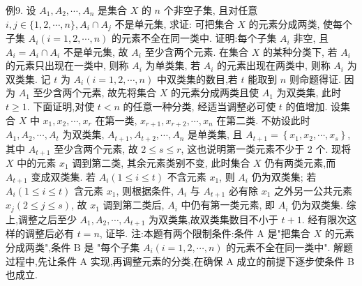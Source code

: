 例9. 设 $A_1, A_2, \cdots, A_n$ 是集合 $X$ 的 $n$ 个非空子集, 且对任意 $i, j \in \{1,2, \cdots, n\}, A_i \cap A_j$ 不是单元集, 求证: 可把集合 $X$ 的元素分成两类, 使每个子集 $A_i(i=1,2, \cdots, n)$ 的元素不全在同一类中.
证明:每个子集 $A_i$ 非空, 且 $A_i=A_i \cap A_i$ 不是单元集, 故 $A_i$ 至少含两个元素.
在集合 $X$ 的某种分类下, 若 $A_i$ 的元素只出现在一类中, 则称 $A_i$ 为单类集, 若 $A_i$ 的元素出现在两类中, 则称 $A_i$ 为双类集.
记 $t$ 为 $A_i(i=1,2, \cdots, n)$ 中双类集的数目,若 $t$ 能取到 $n$ 则命题得证.
因为 $A_1$ 至少含两个元素, 故先将集合 $X$ 的元素分成两类且使 $A_1$ 为双类集, 此时 $t \geqslant 1$.
下面证明,对使 $t<n$ 的任意一种分类, 经适当调整必可使 $t$ 的值增加.
设集合 $X$ 中 $x_1, x_2, \cdots, x_r$ 在第一类, $x_{r+1}, x_{r+2}, \cdots, x_n$ 在第二类.
不妨设此时 $A_1, A_2, \cdots, A_t$ 为双类集, $A_{t+1}, A_{t+2}, \cdots, A_n$ 是单类集, 且 $A_{t+1}= \left\{x_1, x_2, \cdots, x_s\right\}$, 其中 $A_{t+1}$ 至少含两个元素, 故 $2 \leqslant s \leqslant r$, 这也说明第一类元素不少于 2 个.
现将 $X$ 中的元素 $x_1$ 调到第二类, 其余元素类别不变, 此时集合 $X$ 仍有两类元素,而 $A_{t+1}$ 变成双类集.
若 $A_i(1 \leqslant i \leqslant t)$ 不含元素 $x_1$, 则 $A_i$ 仍为双类集; 若 $A_i(1 \leqslant i \leqslant t)$ 含元素 $x_1$, 则根据条件, $A_i$ 与 $A_{t+1}$ 必有除 $x_1$ 之外另一公共元素 $x_j(2 \leqslant j \leqslant s)$, 故
$x_1$ 调到第二类后, $A_i$ 中仍有第一类元素, 即 $A_i$ 仍为双类集.
综上,调整之后至少 $A_1, A_2, \cdots, A_{t+1}$ 为双类集,故双类集数目不小于 $t+1$. 经有限次这样的调整后必有 $t=n$, 证毕.
注:本题有两个限制条件:条件 $\mathrm{A}$ 是"把集合 $X$ 的元素分成两类",条件 $\mathrm{B}$ 是 "每个子集 $A_i(i=1,2, \cdots, n)$ 的元素不全在同一类中". 解题过程中,先让条件 $\mathrm{A}$ 实现,再调整元素的分类,在确保 $\mathrm{A}$ 成立的前提下逐步使条件 B 也成立.


